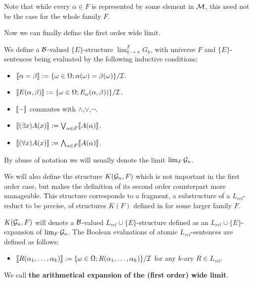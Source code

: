 Note that while every $\alpha\in F$ is represented by some element in $\mathcal{M}$, this need not be the case for the whole family $F$. 



Now we can finally define the first order wide limit.

\begin{defi}
We define a $\mathcal{B}$-valued $\{E\}$-structure $\lim_{k\to n}^{F}G_k$, with universe $F$ and $\{E\}$-sentences being evaluated by the following inductive conditions:
\begin{itemize}
\item $\llbracket \alpha=\beta \rrbracket := \{\omega\in\Omega; \alpha(\omega)=\beta(\omega)\}/\mathcal{I}.$
\item $\llbracket E(\alpha,\beta) \rrbracket := \{\omega\in\Omega; E_\omega(\alpha,\beta))\}/\mathcal{I}$.
\item $\llbracket-\rrbracket$ commutes with $\land$,$\lor$,$\lnot$.
\item $\llbracket(\exists x)A(x)\rrbracket:=\bigvee_{\alpha\in F}\llbracket A(\alpha)\rrbracket$.
\item $\llbracket(\forall x)A(x)\rrbracket:=\bigwedge_{\alpha\in F}\llbracket A(\alpha)\rrbracket$.
\end{itemize}

By abuse of notation we will usually denote the limit $\lim_{F}\mathcal{G}_n$.
\end{defi}

We will also define the structure $K(\mathcal{G}_n,F)$ which is not important in the first order case, but makes the definition of its second order counterpart more manageable. This structure corresponds to a fragment, a substructure of a $L_{rel}$-reduct to be precise, of structures $K(F)$ defined in \cite{krajicek2010forcing} for some larger family $F$.


\begin{defi}
$K(\mathcal{G}_n,F)$ will denote a $\mathcal{B}$-valued $L_{rel}\cup\{E\}$-structure defined as an $L_{rel}\cup\{E\}$-expansion of $\lim_F\mathcal{G}_n$. The Boolean evaluations of atomic $L_{rel}$-sentences are defined as follows:

\begin{itemize}
\item $\llbracket R(\alpha_1,\dots,\alpha_k) \rrbracket := \{\omega\in\Omega; R(\alpha_1,\dots,\alpha_k)\}/\mathcal{I}$ for any $k$-ary $R\in L_{rel}$.
\end{itemize}

We call \textbf{the arithmetical expansion of the (first order) wide limit}.
\end{defi}


